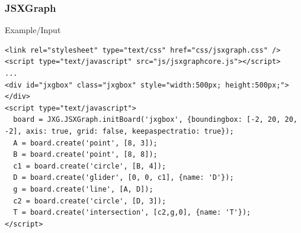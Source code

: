 \documentclass{beamer}
\begin{document}

\begin{frame}[fragile]
  \frametitle{JSXGraph} 
  \begin{block}{Example/Input}
    \begin{lstlisting}
<link rel="stylesheet" type="text/css" href="css/jsxgraph.css" />
<script type="text/javascript" src="js/jsxgraphcore.js"></script>
...
<div id="jxgbox" class="jxgbox" style="width:500px; height:500px;"></div>
<script type="text/javascript">
  board = JXG.JSXGraph.initBoard('jxgbox', {boundingbox: [-2, 20, 20, -2], axis: true, grid: false, keepaspectratio: true});
  A = board.create('point', [8, 3]);
  B = board.create('point', [8, 8]);
  c1 = board.create('circle', [B, 4]);
  D = board.create('glider', [0, 0, c1], {name: 'D'});
  g = board.create('line', [A, D]);
  c2 = board.create('circle', [D, 3]);
  T = board.create('intersection', [c2,g,0], {name: 'T'});
</script>
    \end{lstlisting}
  \end{block}
\end{frame}
\end{document}
